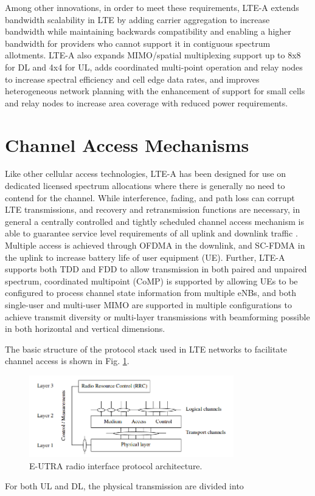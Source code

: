 Among other innovations, in order to meet these requirements, LTE-A extends bandwidth scalability in LTE by adding carrier aggregation to increase bandwidth while maintaining backwards compatibility and enabling a higher bandwidth for providers who cannot support it in contiguous spectrum allotments.  LTE-A also expands MIMO/spatial multiplexing support up to 8x8 for DL and 4x4 for UL, adds coordinated multi-point operation and relay nodes to increase spectral efficiency and cell edge data rates, and improves heterogeneous network planning with the enhancement of support for small cells and relay nodes to increase area coverage with reduced power requirements.

\section{Channel Access Mechanisms}
\label{channel-access}
Like other cellular access technologies, LTE-A has been designed for use on dedicated licensed spectrum allocations where there is generally no need to contend for the channel.  While interference, fading, and path loss can corrupt LTE transmissions, and recovery and retransmission functions are necessary, in general a centrally controlled and tightly scheduled channel access mechanism is able to guarantee service level requirements of all uplink and downlink traffic \cite{tr36300}.  Multiple access is achieved through OFDMA in the downlink, and SC-FDMA in the uplink to increase battery life of user equipment (UE).  Further, LTE-A supports both TDD and FDD to allow transmission in both paired and unpaired spectrum, coordinated multipoint (CoMP) is supported by allowing UEs to be configured to process channel state information from multiple eNBs, and both single-user and multi-user MIMO are supported in multiple configurations to achieve transmit diversity or multi-layer transmissions with beamforming possible in both horizontal and vertical dimensions.

The basic structure of the protocol stack used in LTE networks to facilitate channel access is shown in Fig. \ref{figs:stack}.
\begin{figure}[!ht]
	\centering
	\includegraphics[width=3.5in]{figures3/protocolStack}
	\caption{E-UTRA radio interface protocol architecture.}
	\label{figs:stack}
\end{figure}
For both UL and DL, the physical transmission are divided into 

